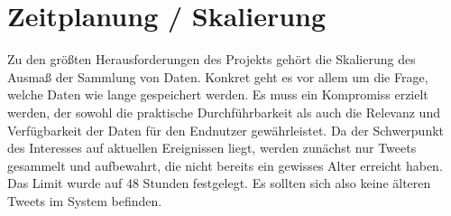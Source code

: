 \section{Zeitplanung / Skalierung}

Zu den größten Herausforderungen des Projekts gehört die Skalierung des Ausmaß der Sammlung
von Daten. Konkret geht es vor allem um die Frage, welche Daten wie lange gespeichert werden.
Es muss ein Kompromiss erzielt werden, der sowohl die praktische Durchführbarkeit als auch die
Relevanz und Verfügbarkeit der Daten für den Endnutzer gewährleistet. Da der Schwerpunkt des
Interesses auf aktuellen Ereignissen liegt, werden zunächst nur Tweets gesammelt und aufbewahrt,
die nicht bereits ein gewisses Alter erreicht haben. Das Limit wurde auf 48 Stunden festgelegt. Es
sollten sich also keine älteren Tweets im System befinden.